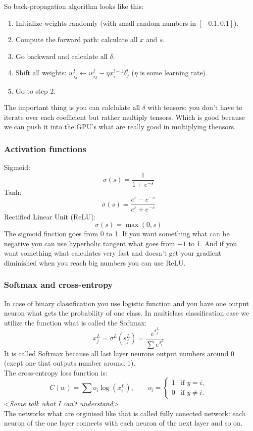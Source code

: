 So back-propagation algorithm looks like this:
\begin{enumerate}[label=\arabic*.]
  \item Initialize weights randomly (with small random numbers in $[-0.1,0.1]$).
  \item Compute the forward path: calculate all $x$ and $s$.
  \item Go backward and calculate all $\delta$.
  \item Shift all weights: $w_{ij}^l\leftarrow w_{ij}^l-\eta x_i^{l-1}\delta_j^l$ ($\eta$ is some learning rate).
  \item Go to step 2.
\end{enumerate}
The important thing is you can calclulate all $\delta$ with tensors: you don't have to iterate over each coefficient but rather multiply tensors. Which is good because we can push it into the GPU's what are really good in multiplying thensors.

\subsubsection*{Activation functions}

Sigmoid: 
$$\sigma(s)=\frac{1}{1+e^{-s}}$$
Tanh:
$$\sigma(s)=\frac{e^s-e^{-s}}{e^s+e^{-s}}$$
Rectified Linear Unit (ReLU):
$$\sigma(s)=\max(0,s)$$
The sigmoid finction goes from 0 to 1. If you want something what can be negative you can use hyperbolic tangent what goes from $-1$ to 1. And if you want something what calculates very fast and doesn't get your gradient diminished when you reach big numbers you can use ReLU.

\subsubsection*{Softmax and cross-entropy}

In case of binary classification you use logistic function and you have one output neuron what gets the probability of one class. In multiclass classification case we utilize the function what is called the Softmax:
$$x_j^L=\sigma^L(s_j^L)=\frac{e^{s_j^L}}{\sum e^{s_i^L}}$$
It is called Softmax because all last layer neurons output numbers around 0 (exept one that outputs number around 1).\\
The cross-entropy loss function is:
$$C(w)=\sum o_i\log(x_i^L),\qquad o_i=\begin{cases}
1&\text{if }y=i,\\
0&\text{if }y\ne i.
\end{cases}$$
{<\it Some talk what I can't understand>}\\
The networks what are orginised like that is called fully conected network: each neuron of the one layer connects with each neuron of the next layer and so on.

